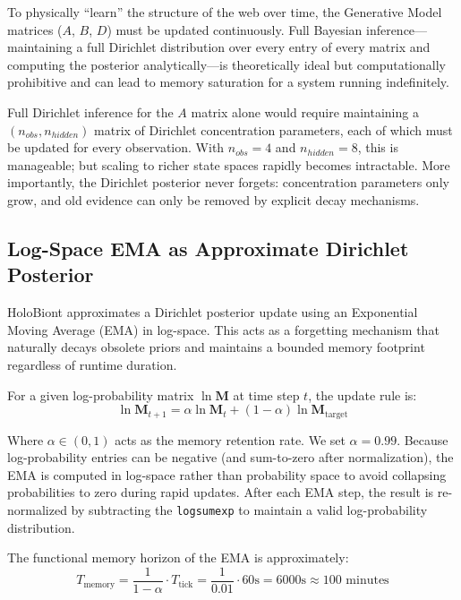 To physically ``learn'' the structure of the web over time, the Generative Model matrices ($A$, $B$, $D$) must be updated continuously. Full Bayesian inference---maintaining a full Dirichlet distribution over every entry of every matrix and computing the posterior analytically---is theoretically ideal but computationally prohibitive and can lead to memory saturation for a system running indefinitely.

Full Dirichlet inference for the $A$ matrix alone would require maintaining a $(n_{obs}, n_{hidden})$ matrix of Dirichlet concentration parameters, each of which must be updated for every observation. With $n_{obs} = 4$ and $n_{hidden} = 8$, this is manageable; but scaling to richer state spaces rapidly becomes intractable. More importantly, the Dirichlet posterior never forgets: concentration parameters only grow, and old evidence can only be removed by explicit decay mechanisms.

\subsection{Log-Space EMA as Approximate Dirichlet Posterior}

HoloBiont approximates a Dirichlet posterior update using an Exponential Moving Average (EMA) in log-space. This acts as a forgetting mechanism that naturally decays obsolete priors and maintains a bounded memory footprint regardless of runtime duration.

For a given log-probability matrix $\ln \mathbf{M}$ at time step $t$, the update rule is:
\begin{equation}
\ln \mathbf{M}_{t+1} = \alpha \ln \mathbf{M}_t + (1-\alpha) \ln \mathbf{M}_{\text{target}}
\label{eq:ema}
\end{equation}

Where $\alpha \in (0, 1)$ acts as the memory retention rate. We set $\alpha = 0.99$. Because log-probability entries can be negative (and sum-to-zero after normalization), the EMA is computed in log-space rather than probability space to avoid collapsing probabilities to zero during rapid updates. After each EMA step, the result is re-normalized by subtracting the \texttt{logsumexp} to maintain a valid log-probability distribution.

The functional memory horizon of the EMA is approximately:
\begin{equation}
T_{\text{memory}} = \frac{1}{1 - \alpha} \cdot T_{\text{tick}} = \frac{1}{0.01} \cdot 60\text{s} = 6000\text{s} \approx 100\text{ minutes}
\end{equation}

